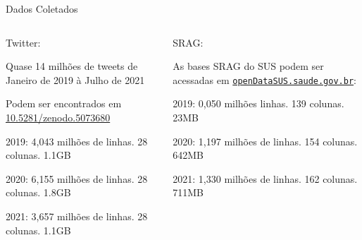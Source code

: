 \documentclass[aspectratio=169]{beamer}                    %
\begin{document}
\begin{frame}{Dados Coletados}
    \begin{columns}
        \begin{column}{0.5\textwidth}
            \large Twitter:
            \vfill
            \begin{vfilleditems}
                \item Quase 14 milhões de tweets de Janeiro de 2019 à Julho de 2021 \parencite{santosBrazilianPortugueseCOVID192021}
                \item Podem ser encontrados em \href{https://doi.org/10.5281/zenodo.5073680}{10.5281/zenodo.5073680}
                \begin{vfilleditems}
                    \item 2019: 4,043 milhões de linhas. 28 colunas. 1.1GB
                    \item 2020: 6,155 milhões de linhas. 28 colunas. 1.8GB
                    \item 2021: 3,657 milhões de linhas. 28 colunas. 1.1GB
                \end{vfilleditems}
            \end{vfilleditems}
        \end{column}
        \begin{column}{0.5\textwidth}
            \large SRAG:
            \vfill
            \begin{vfilleditems}
                \item As bases SRAG do SUS podem ser acessadas em \href{https://opendatasus.saude.gov.br/dataset?tags=SRAG}{\texttt{openDataSUS.saude.gov.br}}:
                \begin{vfilleditems}
                    \item 2019: 0,050 milhões linhas. 139 colunas. 23MB
                    \item 2020: 1,197 milhões de linhas. 154 colunas. 642MB
                    \item 2021: 1,330 milhões de linhas. 162 colunas. 711MB
                \end{vfilleditems}
            \end{vfilleditems}
        \end{column}
    \end{columns}
\end{frame}
\end{document}
